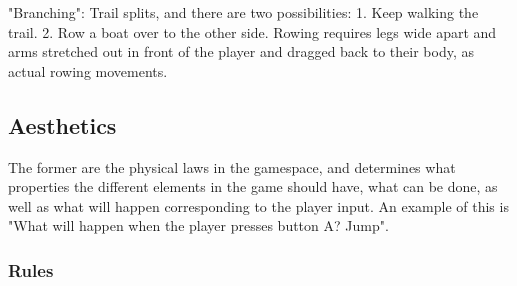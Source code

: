 "Branching": Trail splits, and there are two possibilities: 1. Keep walking the trail. 2. Row a boat over to the other side. Rowing requires legs wide apart and arms stretched out in front of the player and dragged back to their body, as actual rowing movements. 

\subsection{Aesthetics}

The former are the physical laws in the gamespace, and determines what properties the different elements in the game should have, what can be done, as well as what will happen corresponding to the player input. An example of this is "What will happen when the player presses button A? Jump".

\subsubsection{Rules} 
 

